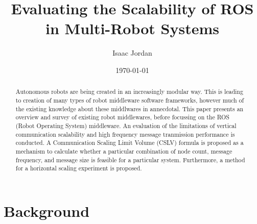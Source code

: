 \documentclass{l4proj}
\begin{document}
\title{Evaluating the Scalability of ROS in Multi-Robot Systems}
\author{Isaac Jordan}
\date{\today}
\maketitle

\begin{abstract}
Autonomous robots are being created in an increasingly modular way. This is leading to creation of many types of robot middleware software frameworks, however much of the existing knowledge about these middlwares in annecdotal. This paper presents an overview and survey of existing robot middlewares, before focussing on the ROS (Robot Operating System) middleware. An evaluation of the limitations of vertical communication scalability and high frequency message tranmission performance is conducted. A Communication Scaling Limit Volume (CSLV) formula is proposed as a mechanism to calculate whether a particular combination of node count, message frequency, and message size is feasible for a particular system. Furthermore, a method for a horizontal scaling experiment is proposed. 
\end{abstract}

\educationalconsent
%
%
\tableofcontents

\pagebreak
{}




\chapter{Background}
\label{background-chapter}






\end{document}
